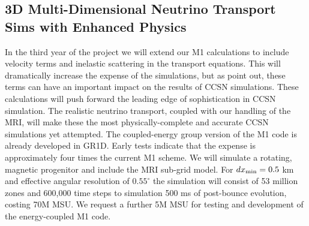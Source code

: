 %

\vspace{0.1in} 


\subsection{3D Multi-Dimensional Neutrino Transport Sims with Enhanced Physics}
\label{sec:enhancedM1}

In the third year of the project we will extend our M1 calculations to include velocity terms and inelastic scattering in the transport equations.
This will dramatically increase the expense of the simulations, but as \citet{Lentz:2012fy} point out, these terms can have an important impact on the results of CCSN simulations.
These calculations will push forward the leading edge of sophistication in CCSN simulation.
The realistic neutrino transport, coupled with our handling of the MRI, will make these the most physically-complete and accurate CCSN simulations yet attempted.
The coupled-energy group version of the M1 code is already developed in GR1D.
Early tests indicate that the expense is approximately four times the current M1 scheme.
We will simulate a rotating, magnetic progenitor and include the MRI sub-grid model.
For $dx_{\rm min} = 0.5$ km and effective angular resolution of $0.55^\circ$ the simulation will consist of 53 million zones and 600,000 time steps to simulation 500 ms of post-bounce evolution, costing 70M MSU.
We request a further 5M MSU for testing and development of the energy-coupled M1 code.


